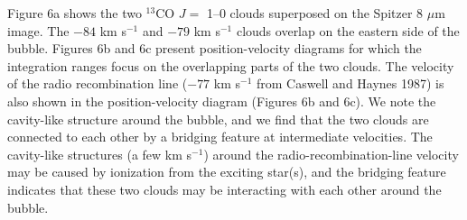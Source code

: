 \documentclass[onecolumn]{pasj01}
\begin{document}
{{{{{Figure 6a} {shows the two $^{13}$CO $J=$ 1--0 clouds} superposed on the Spitzer 8 $\mu$m image.
{{The $-84$ km s$^{-1}$ and $-79$ km s$^{-1}$} {clouds} overlap on the eastern side of the bubble.}
{Figures 6b and 6c} present position-velocity diagrams {for which the} integration ranges focus on the overlapping part{s} of the two clouds. 
{The velocity of {the radio recombination line ($-77$ km s$^{-1}$ from Caswell and Haynes 1987}) is also shown in the position-velocity diagram ({Figures 6b and 6c}).
{We note the cavity-like structure around the bubble, and we find that {the} two clouds {are connected} to each other {by a} bridging feature at intermediate velocities.} The cavity-like structures ({a few km s$^{-1}$}) around the {radio-recombination-line} velocity may be caused by ionization from the exciting star(s), and the bridging feature indicates that these two clouds may be interacting with each other around the bubble.}



}}}}
\end{document}
